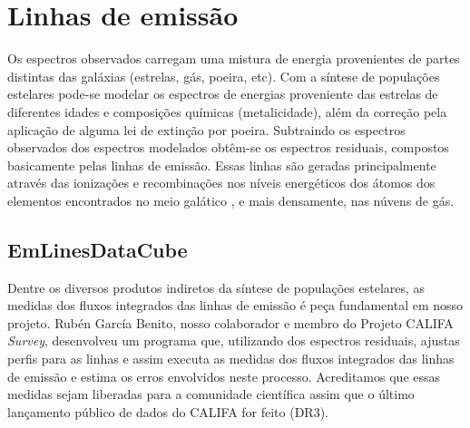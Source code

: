


\chapter{Linhas de emissão}
\label{sec:emlines}

Os espectros observados carregam uma mistura de energia provenientes de partes distintas das
galáxias (estrelas, gás, poeira, etc). Com a síntese de populações estelares pode-se modelar os
espectros de energias proveniente das estrelas de diferentes idades e composições químicas
(metalicidade), além da correção pela aplicação de alguma lei de extinção por poeira. Subtraindo os
espectros observados dos espectros modelados obtêm-se os espectros residuais, compostos basicamente
pelas linhas de emissão. Essas linhas são geradas principalmente através das ionizações e
recombinações nos níveis energéticos dos átomos dos elementos encontrados no meio galático
 , e mais densamente, nas núvens de gás. 

\section{EmLinesDataCube}
\label{sec:emline:datacube}

Dentre os diversos produtos indiretos da síntese de populações estelares, as medidas dos fluxos
integrados das linhas de emissão é peça fundamental em nosso projeto. Rubén García Benito, nosso
colaborador e membro do Projeto CALIFA {\em Survey}, desenvolveu um programa que, utilizando dos
espectros residuais, ajustas perfis para as linhas e assim executa as medidas dos fluxos integrados
das linhas de emissão e estima os erros envolvidos neste processo. Acreditamos que essas medidas
sejam liberadas para a comunidade científica assim que o último lançamento público de dados do
CALIFA for feito (DR3). 

